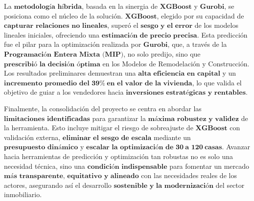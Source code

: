 La $\mathbf{\text{metodología híbrida}}$, basada en la sinergia de $\mathbf{XGBoost}$ y $\mathbf{Gurobi}$, se posiciona como el núcleo de la solución. $\mathbf{XGBoost}$, elegido por su capacidad de $\mathbf{\text{capturar relaciones no lineales}}$, superó el $\mathbf{\text{sesgo y el error}}$ de los modelos lineales iniciales, ofreciendo una $\mathbf{\text{estimación de precio precisa}}$. Esta predicción fue el pilar para la optimización realizada por $\mathbf{Gurobi}$, que, a través de la $\mathbf{\text{Programación Entera Mixta (MIP)}}$, no solo predijo, sino que $\mathbf{\text{prescribió la decisión óptima}}$ en los Modelos de Remodelación y Construcción. Los resultados preliminares demuestran una $\mathbf{\text{alta eficiencia en capital}}$ y un $\mathbf{\text{incremento promedio del } 39\% \ \text{en el valor de la vivienda}}$, lo que valida el objetivo de guiar a los vendedores hacia $\mathbf{\text{inversiones estratégicas y rentables}}$.

Finalmente, la consolidación del proyecto se centra en abordar las $\mathbf{\text{limitaciones identificadas}}$ para garantizar la $\mathbf{\text{máxima robustez y validez}}$ de la herramienta. Esto incluye mitigar el riesgo de sobreajuste de $\mathbf{XGBoost}$ con validación externa, $\mathbf{\text{eliminar el sesgo de escala}}$ mediante un $\mathbf{\text{presupuesto dinámico}}$ y $\mathbf{\text{escalar la optimización de } 30 \ \text{a } 120 \ \text{casas}}$. Avanzar hacia herramientas de predicción y optimización tan robustas no es solo una necesidad técnica, sino una $\mathbf{\text{condición indispensable}}$ para fomentar un mercado $\mathbf{\text{más transparente, equitativo y alineado}}$ con las necesidades reales de los actores, asegurando así el desarrollo $\mathbf{\text{sostenible y la modernización}}$ del sector inmobiliario.
